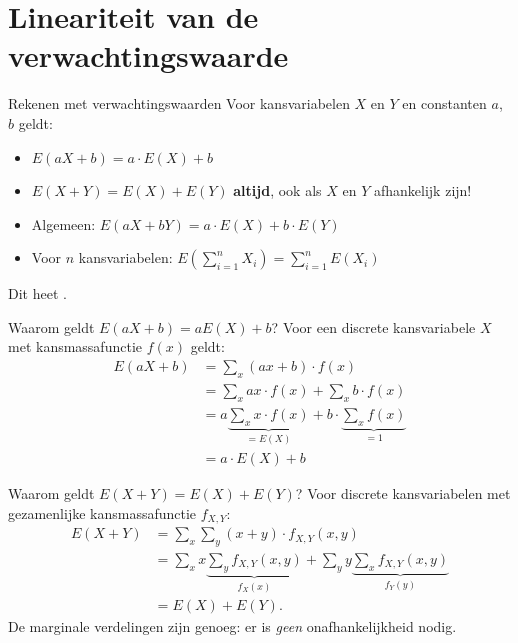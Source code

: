 \section{Lineariteit van de verwachtingswaarde}

    \begin{frame}{Rekenen met verwachtingswaarden}
        Voor kansvariabelen $X$ en $Y$ en constanten $a$, $b$ geldt:
        \begin{itemize}[<+->]\setlength\itemsep{1.5em}
            \item $E(aX + b) = a \cdot E(X) + b$
            \item $E(X + Y) = E(X) + E(Y)$ \hfill \textbf{altijd}, ook als $X$ en $Y$ afhankelijk zijn!
            \item Algemeen: $E(a X + b Y) = a \cdot E(X) + b \cdot E(Y)$
            \item Voor $n$ kansvariabelen: $E\left(\sum_{i=1}^n X_i\right) = \sum_{i=1}^n E(X_i)$
        \end{itemize}
        \vfill\pause
        Dit heet .
    \end{frame}

    \begin{frame}{Waarom geldt $E(aX+b) = aE(X)+b$?}
        Voor een discrete kansvariabele $X$ met kansmassafunctie $f(x)$ geldt:
        \begin{align*}
            E(aX+b)     &= \sum_x (ax+b) \cdot f(x) \\
                        &= \sum_x ax \cdot f(x) + \sum_{x} b \cdot f(x) \\
                        &= a \underbrace{\sum_x x \cdot f(x)}_{=E(X)} + b \cdot \underbrace{\sum_x f(x)}_{=1} \\
                        &= a \cdot E(X) + b
        \end{align*}
    \end{frame}

    \begin{frame}{Waarom geldt $E(X+Y) = E(X) + E(Y)$?}
        Voor discrete kansvariabelen met gezamenlijke kansmassafunctie $f_{X,Y}$:
        \begin{align*}
            E(X + Y)    &= \sum_x \sum_y (x + y) \cdot f_{X,Y}(x, y) \\
                        &= \sum_x x \underbrace{\sum_y f_{X,Y}(x,y)}_{f_X(x)} + \sum_y y \underbrace{\sum_x f_{X,Y}(x,y)}_{f_Y(y)} \\
                        &= E(X) + E(Y).
        \end{align*}
        \vfill
        De marginale verdelingen zijn genoeg: er is \emph{geen} onafhankelijkheid nodig.
    \end{frame}

